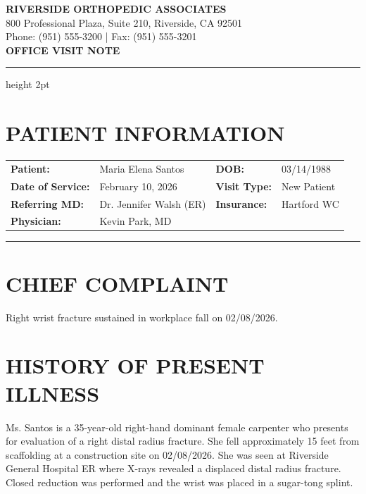\documentclass[11pt]{article}
\begin{document}
\begin{center}
{\Large\bfseries\color{orthogreen} RIVERSIDE ORTHOPEDIC ASSOCIATES}\\[0.3em]
{\small 800 Professional Plaza, Suite 210, Riverside, CA 92501}\\
{\small Phone: (951) 555-3200 | Fax: (951) 555-3201}\\[1em]
{\LARGE\bfseries OFFICE VISIT NOTE}
\end{center}

\vspace{0.5em}
\hrule height 2pt
\vspace{1em}

\section*{PATIENT INFORMATION}

\begin{tabular}{@{}p{3.5cm}p{5cm}p{3cm}p{4cm}@{}}
\textbf{Patient:} & Maria Elena Santos & \textbf{DOB:} & 03/14/1988 \\
\textbf{Date of Service:} & February 10, 2026 & \textbf{Visit Type:} & New Patient \\
\textbf{Referring MD:} & Dr. Jennifer Walsh (ER) & \textbf{Insurance:} & Hartford WC \\
\textbf{Physician:} & Kevin Park, MD & & \\
\end{tabular}

\vspace{1em}
\hrule
\vspace{1em}

\section*{CHIEF COMPLAINT}

Right wrist fracture sustained in workplace fall on 02/08/2026.

\section*{HISTORY OF PRESENT ILLNESS}

Ms. Santos is a 35-year-old right-hand dominant female carpenter who presents for evaluation of a right distal radius fracture. She fell approximately 15 feet from scaffolding at a construction site on 02/08/2026. She was seen at Riverside General Hospital ER where X-rays revealed a displaced distal radius fracture. Closed reduction was performed and the wrist was placed in a sugar-tong splint.
\end{document}
